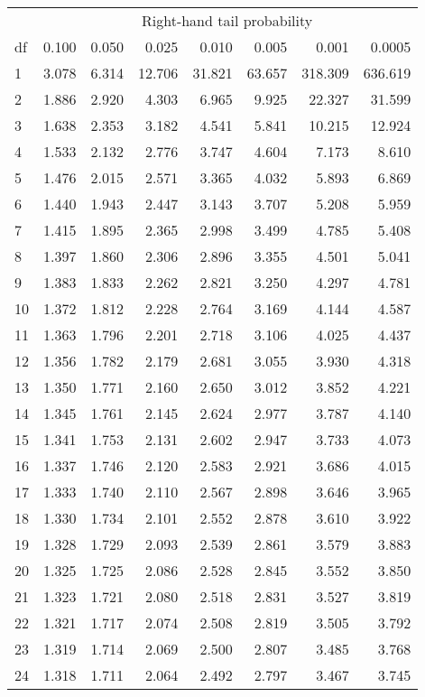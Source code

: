 \begin{center}
\begin{tabular}{|l|rrrrrrr|}\hline
& \multicolumn{7}{|c|}{Right-hand tail probability} \\ \cline{2-8}
df	&0.100	&0.050	&0.025	&0.010	&0.005&0.001 & 0.0005\\ \hline
1	&3.078	&6.314	&12.706	&31.821&63.657& 318.309&636.619\\
2	&1.886	&2.920	&4.303	&6.965	&9.925&  22.327& 31.599\\
3	&1.638	&2.353	&3.182	&4.541	&5.841&  10.215& 12.924\\
4	&1.533	&2.132	&2.776	&3.747	&4.604&   7.173&  8.610\\
5	&1.476	&2.015	&2.571	&3.365	&4.032&   5.893&  6.869\\
6	&1.440	&1.943	&2.447	&3.143	&3.707&   5.208&  5.959\\
7	&1.415	&1.895	&2.365	&2.998	&3.499&   4.785&  5.408\\
8	&1.397	&1.860	&2.306	&2.896	&3.355&   4.501&  5.041\\
9	&1.383	&1.833	&2.262	&2.821	&3.250&   4.297&  4.781\\
10	&1.372	&1.812	&2.228	&2.764	&3.169&   4.144&  4.587\\
11	&1.363	&1.796	&2.201	&2.718	&3.106&   4.025&  4.437\\
12	&1.356	&1.782	&2.179	&2.681	&3.055&   3.930&  4.318\\
13	&1.350	&1.771	&2.160	&2.650	&3.012&   3.852&  4.221\\
14	&1.345	&1.761	&2.145	&2.624	&2.977&   3.787&  4.140\\
15	&1.341	&1.753	&2.131	&2.602	&2.947&   3.733&  4.073\\
16	&1.337	&1.746	&2.120	&2.583	&2.921&   3.686&  4.015\\
17	&1.333	&1.740	&2.110	&2.567	&2.898&   3.646&  3.965\\
18	&1.330	&1.734	&2.101	&2.552	&2.878&   3.610&  3.922\\
19	&1.328	&1.729	&2.093	&2.539	&2.861&   3.579&  3.883\\
20	&1.325	&1.725	&2.086	&2.528	&2.845&   3.552&  3.850\\
21	&1.323	&1.721	&2.080	&2.518	&2.831&   3.527&  3.819\\
22	&1.321	&1.717	&2.074	&2.508	&2.819&   3.505&  3.792\\
23	&1.319	&1.714	&2.069	&2.500	&2.807&   3.485&  3.768\\
24	&1.318	&1.711	&2.064	&2.492	&2.797&   3.467&  3.745\\

\end{tabular}
\end{center}
